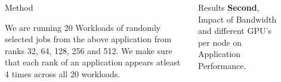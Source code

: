 \documentclass[final]{beamer}
\newlength{\sepwid}
\newlength{\onecolwid}
\newlength{\twocolwid}
\begin{document}
\begin{frame}[t]
\begin{columns}[t]
\begin{column}{\onecolwid}

\end{column} %

\begin{column}{\sepwid}\end{column} %

\begin{column}{\twocolwid} %

\begin{columns}[t,totalwidth=\twocolwid] %

\begin{column}{\onecolwid}\vspace{-.6in} %
\vspace{-1em}

\begin{block}{Method}

We are running 20 Workloads of randomly selected jobs from the above application from ranks 32, 64, 128, 256 and 512. We make sure that each rank of an application appears atleast 4 times across all 20 workloads. 
\end{block}

\end{column} %

\begin{column}{\onecolwid}\vspace{-.6in} %

\vspace{-1em}
\begin{block}{Results}
\newline
\textbf{Second}, Impact of Bandwidth and different GPU's per node on Application Performance.


\end{block}
\end{column}
\end{columns}
\end{column}
\end{columns}
\end{frame}
\end{document}
